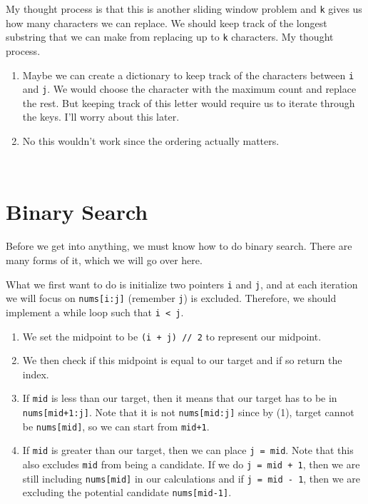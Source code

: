 \documentclass{article}
\begin{document}
  \begin{example}
    My thought process is that this is another sliding window problem and \texttt{k} gives us how many characters we can replace. We should keep track of the longest substring that we can make from replacing up to \texttt{k} characters. My thought process. 
    \begin{enumerate}
      \item Maybe we can create a dictionary to keep track of the characters between \texttt{i} and \texttt{j}. We would choose the character with the maximum count and replace the rest. But keeping track of this letter would require us to iterate through the keys. I'll worry about this later. 
      \item No this wouldn't work since the ordering actually matters. 
    \end{enumerate}
    \begin{lstlisting}
      
    \end{lstlisting}
  \end{example}

\section{Binary Search}

  Before we get into anything, we must know how to do binary search. There are many forms of it, which we will go over here. 

  What we first want to do is initialize two pointers \texttt{i} and \texttt{j}, and at each iteration we will focus on \texttt{nums[i:j]} (remember \texttt{j}) is excluded. Therefore, we should implement a while loop such that \texttt{i < j}. 
  \begin{enumerate}
    \item We set the midpoint to be \texttt{(i + j) // 2} to represent our midpoint. 
    \item We then check if this midpoint is equal to our target and if so return the index. 
    \item If \texttt{mid} is less than our target, then it means that our target has to be in \texttt{nums[mid+1:j]}. Note that it is not \texttt{nums[mid:j]} since by (1), target cannot be \texttt{nums[mid]}, so we can start from \texttt{mid+1}. 
    \item If \texttt{mid} is greater than our target, then we can place \texttt{j = mid}. Note that this also excludes \texttt{mid} from being a candidate. If we do \texttt{j = mid + 1}, then we are still including \texttt{nums[mid]} in our calculations and if \texttt{j = mid - 1}, then we are excluding the potential candidate \texttt{nums[mid-1]}. 
  \end{enumerate}
\end{document}
